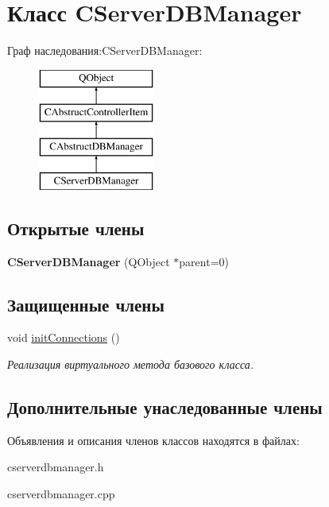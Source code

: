 \hypertarget{class_c_server_d_b_manager}{}\section{Класс C\+Server\+D\+B\+Manager}
\label{class_c_server_d_b_manager}
Граф наследования\+:C\+Server\+D\+B\+Manager\+:\begin{figure}[H]
\begin{center}
\leavevmode
\includegraphics[height=4.000000cm]{class_c_server_d_b_manager}
\end{center}
\end{figure}
\subsection*{Открытые члены}
\begin{DoxyCompactItemize}
\item 
\hypertarget{class_c_server_d_b_manager_af2bf11fcced1aad0ccd34a3d16c45a03}{}\label{class_c_server_d_b_manager_af2bf11fcced1aad0ccd34a3d16c45a03} 
{\bfseries C\+Server\+D\+B\+Manager} (Q\+Object $\ast$parent=0)
\end{DoxyCompactItemize}
\subsection*{Защищенные члены}
\begin{DoxyCompactItemize}
\item 
\hypertarget{class_c_server_d_b_manager_a6dcd2f88c0845cc79a47bac2ab9e9235}{}\label{class_c_server_d_b_manager_a6dcd2f88c0845cc79a47bac2ab9e9235} 
void \hyperlink{class_c_server_d_b_manager_a6dcd2f88c0845cc79a47bac2ab9e9235}{init\+Connections} ()
\begin{DoxyCompactList}\small\item\em Реализация виртуального метода базового класса. \end{DoxyCompactList}\end{DoxyCompactItemize}
\subsection*{Дополнительные унаследованные члены}


Объявления и описания членов классов находятся в файлах\+:\begin{DoxyCompactItemize}
\item 
cserverdbmanager.\+h\item 
cserverdbmanager.\+cpp\end{DoxyCompactItemize}
